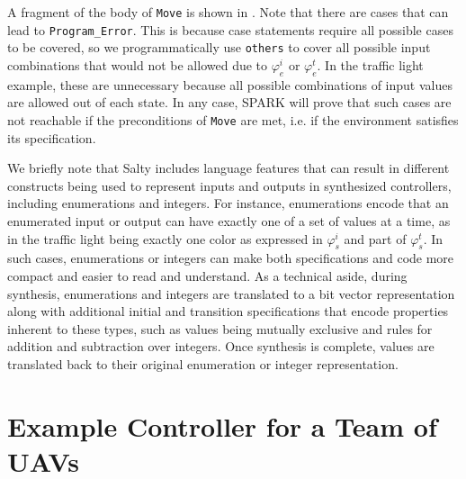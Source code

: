 \documentclass[runningheads]{llncs}
\begin{document}
A fragment of the body of \lstinline{Move} is shown in . 
Note that there are cases that can lead to \lstinline{Program_Error}. 
This is because case statements require all possible cases to be covered, so 
we programmatically use \lstinline{others} to cover all possible input combinations 
that would not be allowed due to $\varphi_e^i$ or $\varphi_e^t$. 
In the traffic light example, these are unnecessary because all possible combinations of input values are 
allowed out of each state. 
In any case, SPARK will prove that such cases are not reachable if the preconditions of \lstinline{Move} are met, i.e. if the environment satisfies its specification.

We briefly note that Salty includes language features that can result in different constructs being used 
to represent inputs and outputs in synthesized controllers, including enumerations and integers.
For instance, enumerations encode that an enumerated input or output can have exactly one of a set of values at a time, 
as in the traffic light being exactly one color as expressed in $\varphi_s^i$ and part  of $\varphi_s^t$. 
In such cases, enumerations or integers can make both specifications and code more compact and easier to read and understand. 
As a technical aside, during synthesis, enumerations and integers are translated to a bit vector representation along with additional  
initial and transition specifications that encode properties inherent to these types, such as 
values being mutually exclusive and rules for addition and subtraction over integers. 
Once synthesis is complete, values are translated back to their original enumeration or integer representation.

\section{Example Controller for a Team of UAVs}
\label{sec:vipExample}
\end{document}
